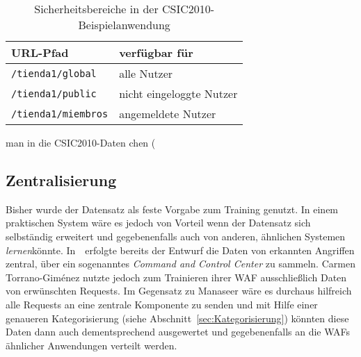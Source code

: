 \begin{table}[h]
  \centering
  \begin{tabular}{lp{7cm}}
    \toprule
    \textbf{URL-Pfad} & \textbf{verfügbar für} \\
    \midrule
    \verb=/tienda1/=\textcolor{bhtBlue}{\verb=global=}}\verb=/= & alle Nutzer\\
    \verb=/tienda1/=\textcolor{bhtBlue}{\verb=public=}}\verb=/= & nicht eingeloggte Nutzer  \\ 
    \verb=/tienda1/=\textcolor{bhtBlue}{\verb=miembros=}}\verb=/= & angemeldete Nutzer  \\
    \bottomrule
  \end{tabular}
  
  \caption{Sicherheitsbereiche in der CSIC2010-Beispielanwendung}
  \label{tab:csicsecarea}
\end{table}

man in die CSIC2010-Daten chen (




\subsection{Zentralisierung}
\label{sec:zentralisierungkern}

Bisher wurde der Datensatz als feste Vorgabe zum Training genutzt. In einem praktischen System wäre es jedoch von Vorteil wenn der Datensatz sich selbständig erweitert und gegebenenfalls auch von anderen, ähnlichen Systemen \glqq\emph{lernen}\grqq könnte. In~\cite{Manaseer2018}~erfolgte bereits der Entwurf die Daten von erkannten Angriffen zentral, über ein sogenanntes \emph{Command and Control Center} zu sammeln. Carmen Torrano-Giménez nutzte jedoch zum Trainieren ihrer WAF ausschließlich Daten von erwünschten Requests. Im Gegensatz zu Manaseer wäre es durchaus hilfreich alle Requests an eine zentrale Komponente zu senden und mit Hilfe einer genaueren Kategorisierung (siehe Abschnitt~\ref{sec:Kategorisierung}) könnten diese Daten dann auch dementsprechend ausgewertet und gegebenenfalls an die WAFs ähnlicher Anwendungen verteilt werden.


